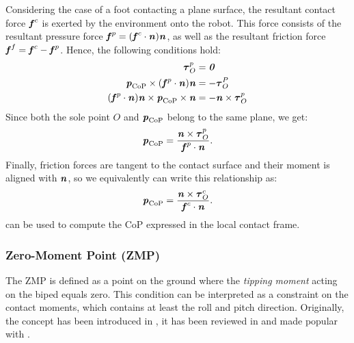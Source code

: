 Considering the case of a foot contacting a plane surface, the resultant contact force $\bm{\mathit{f}}^c$ is exerted by the environment onto the robot. This force consists of the resultant pressure force $\bm{\mathit{f}}^p=(\bm{\mathit{f}}^c\cdot\bm{\mathit{n}})\bm{\mathit{n}}$, as well as the resultant friction force ${\bm{\mathit{f}}^f=\bm{\mathit{f}}^c-\bm{\mathit{f}}^p}$.
Hence, the following conditions hold:
\begin{align*}
\bm{\mathit{\tau}}_O^p 		&= \bm{\mathit{0}} \\
\bm{\mathit{p}}_{\text{CoP}}\times(\bm{\mathit{f}}^p\cdot\bm{\mathit{n}})\bm{\mathit{n}}	&= -\bm{\mathit{\tau}}_O^P \\
(\bm{\mathit{f}}^p\cdot\bm{\mathit{n}})\bm{\mathit{n}}\times\bm{\mathit{p}}_{\text{CoP}}\times\bm{\mathit{n}}	&= -\bm{\mathit{n}}\times\bm{\mathit{\tau}}_O^p
\end{align*}
Since both the sole point $O$ and $\bm{\mathit{p}}_{\text{CoP}}$ belong to the same plane, we get:
\begin{equation*}
\bm{\mathit{p}}_{\text{CoP}}=\dfrac{\bm{\mathit{n}}\times\bm{\mathit{\tau}}_O^p}{\bm{\mathit{f}}^p\cdot\bm{\mathit{n}}}.
\end{equation*}
Finally, friction forces are tangent to the contact surface and their moment is aligned with $\bm{\mathit{n}}$, so we equivalently can write this relationship as:
\begin{equation}\label{eqn:CoPComputation}
\bm{\mathit{p}}_{\text{CoP}}=\dfrac{\bm{\mathit{n}}\times\bm{\mathit{\tau}}_O^c}{\bm{\mathit{f}}^c\cdot\bm{\mathit{n}}}.
\end{equation}
 can be used to compute the \gls{CoP} expressed in the local contact frame.

%
\subsubsection{Zero-Moment Point (ZMP)}
The \gls{ZMP} is defined as a point on the ground where the \textit{tipping moment} acting on the biped equals zero. This condition can be interpreted as a constraint on the contact moments, which contains at least the roll and pitch direction. Originally, the concept has been introduced in \cite{vukobratovic1972stability}, it has been reviewed in \cite{vukobratovic2004zero} and made popular with \cite{kajita2003biped}.

